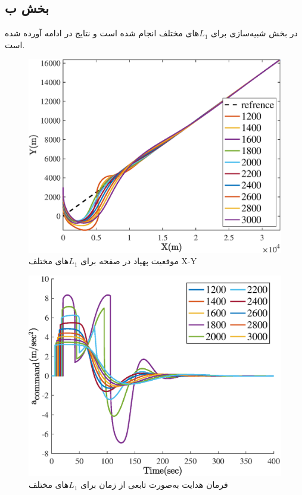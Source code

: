 \subsection{بخش ب}
در بخش شبیه‌سازی برای 
$L_1$های مختلف انجام شده است و نتایج در ادامه آورده شده است.

\begin{figure}[H]
    \label{fig:q2_1}
	\centering
	\includegraphics[width=.75\linewidth]{../Figure/Q2/b/xy}
	\caption{موقعیت پهپاد در صفحه  برای $L_1$های مختلف X-Y  }
\end{figure}

\begin{figure}[H]
    \label{fig:q2_1}
	\centering
	\includegraphics[width=.75\linewidth]{../Figure/Q2/b/acc}
	\caption{فرمان هدایت به‌صورت تابعی از زمان برای $L_1$های مختلف}
\end{figure}
